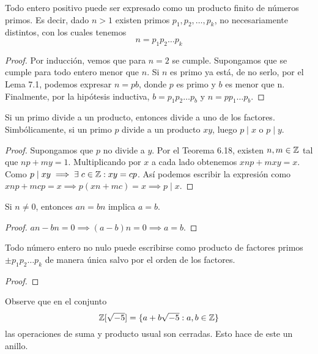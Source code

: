 \documentclass[main.tex]{subfiles}
\begin{document}
\begin{lemma}
    Todo entero positivo puede ser expresado como un producto finito de n\'umeros primos. Es decir, dado $n > 1$ existen primos $p_1, p_2, \dots, p_k$, no necesariamente distintos, con los cuales tenemos
    $$n = p_1 p_2 \dots p_k$$
\end{lemma}

\begin{proof}
    Por inducci\'on, vemos que para $n = 2$ se cumple. Supongamos que se cumple para todo entero menor que $n$. Si $n$ es primo ya est\'a, de no serlo, por el Lema 7.1, podemos expresar $n = pb$, donde $p$ es primo y $b$ es menor que n. Finalmente, por la hip\'otesis inductiva, $b = p_1 p_2 \dots p_b$ y $n = p p_1 \dots p_b$.
\end{proof}

\begin{lemma}
    Si un primo divide a un producto, entonces divide a uno de los factores. Simb\'olicamente, si un primo $p$ divide a un producto $xy$, luego $p \mid x$ o $p \mid y$.
\end{lemma}

\begin{proof}
    Supongamos que $p$ no divide a $y$. Por el Teorema 6.18, existen $n, m \in \mathbb Z$ tal que $np + my = 1$. Multiplicando por $x$ a cada lado obtenemos $xnp + mxy = x$. Como $p \mid xy \implies \exists \; c \in \mathbb Z : xy = cp$. As\'i podemos escribir la expresi\'on como $xnp + mcp = x \implies p(xn + mc) = x \implies p \mid x$.
\end{proof}

\begin{lemma}
    Si $n \not= 0$, entonces $an = bn$ implica $a = b$.
\end{lemma}

\begin{proof}
    $an - bn = 0 \implies (a - b)n = 0 \implies a = b$.
\end{proof}

\begin{theorem}
    Todo n\'umero entero no nulo puede escribirse como producto de factores primos $\pm p_1 p_2 \dots p_k$ de manera \'unica salvo por el orden de los factores.
\end{theorem}

\begin{proof}
    
\end{proof}

\begin{example}
    Observe que en el conjunto
    $$\mathbb Z[\sqrt{-5}] = \{a + b\sqrt{-5} : a, b \in \mathbb Z\}$$
    las operaciones de suma y producto usual son cerradas. Esto hace de este un anillo.
\end{example}
\end{document}
